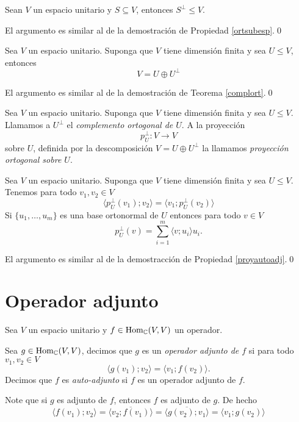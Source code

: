 \begin{pro}
Sean $V$ un espacio unitario y $S\subseteq V$, entonces $S^\perp\le V$.
\end{pro}

\dem El argumento es similar al de la demostraci\'on de Propiedad \ref{ortsubesp}.\qed

\begin{teo}
Sea $V$ un espacio unitario. Suponga que $V$ tiene dimensi\'on finita y sea $U\le V$, entonces
\[
V=U\oplus U^\perp
\]
\end{teo}

\dem El argumento es similar al de la demostraci\'on de Teorema \ref{complort}.\qed

\begin{defn}
Sea $V$ un espacio unitario. Suponga que $V$ tiene dimensi\'on finita y sea $U\le V$. Llamamos a $U^\perp$ el \emph{complemento ortogonal de $U$}. A la proyecci\'on
\[
p^\perp_U:V\longrightarrow V
\]
sobre $U$, definida por la descomposici\'on $V=U\oplus U^\perp$ la llamamos \emph{proyecci\'on ortogonal sobre $U$}.
\end{defn}

\begin{pro}
Sea $V$ un espacio unitario. Suponga que $V$ tiene dimensi\'on finita y sea $U\le V$. Tenemos para todo $v_1,v_2\in V$
\[
\langle p^\perp_U(v_1);v_2\rangle=\langle v_1;p^\perp_U(v_2)\rangle
\]
Si $\{u_1,\ldots,u_m\}$ es una base ortonormal de $U$ entonces para todo $v\in V$
\[
p^\perp_U(v)=\sum_{i=1}^m\langle v;u_i\rangle u_i.
\]
\end{pro}

\dem El argumento es similar al de la demostracci\'on de Propiedad \ref{proyautoadj}.\qed

\section{Operador adjunto}

Sea $V$ un espacio unitario y $f\in\operatorname{Hom}_\mathbb{C}(V,V)$ un operador.

\begin{defn}
Sea $g\in\operatorname{Hom}_\mathbb{C}(V,V)$, decimos que $g$ es un \emph{operador adjunto de $f$} si para todo $v_1,v_2\in V$
\[
\langle g(v_1);v_2 \rangle=\langle v_1;f(v_2)\rangle.
\]
Decimos que $f$ es \emph{auto-adjunto} si $f$ es un operador adjunto de $f$. 
\end{defn}

\begin{obs}
Note que si $g$ es adjunto de $f$, entonces $f$ es adjunto de $g$. De hecho
\[
\langle f(v_1);v_2\rangle= \overline{\langle v_2;f(v_1)\rangle}= \overline{\langle g(v_2);v_1\rangle}= \langle v_1;g(v_2)\rangle
\]
\end{obs}

